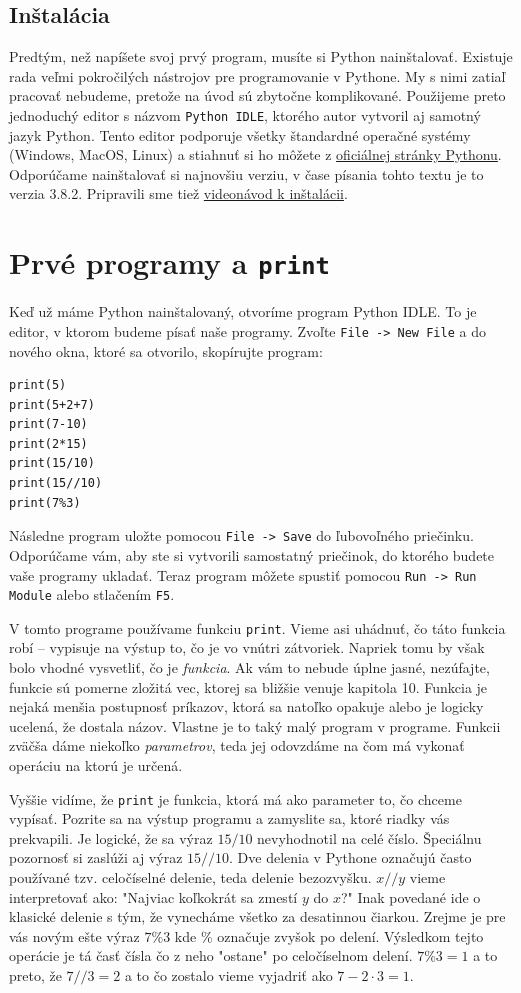 \documentclass{article}
\begin{document}
\subsection{Inštalácia}
Predtým, než napíšete svoj prvý program, musíte si Python nainštalovať. Existuje rada veľmi pokročilých nástrojov pre programovanie v Pythone. My s nimi zatiaľ pracovať nebudeme, pretože na úvod sú zbytočne komplikované.
Použijeme preto jednoduchý editor s názvom \texttt{Python IDLE}, ktorého autor vytvoril aj samotný jazyk Python. Tento editor podporuje všetky štandardné operačné systémy (Windows, MacOS, Linux) a stiahnuť si ho môžete z \href{https://www.python.org/downloads/}{oficiálnej stránky Pythonu}. Odporúčame nainštalovať si najnovšiu verziu, v čase písania tohto textu je to verzia 3.8.2. Pripravili sme tiež \href{https://www.youtube.com/watch?v=_oLcUfkgxSI}{videonávod k inštalácii}.

\section{Prvé programy a \texttt{print}}
Keď už máme Python nainštalovaný, otvoríme program Python IDLE. To je editor, v ktorom budeme písať naše programy. Zvoľte \texttt{File -> New File} a do nového okna, ktoré sa otvorilo, skopírujte program:
\begin{lstlisting}
print(5)
print(5+2+7)
print(7-10)
print(2*15)
print(15/10)
print(15//10)
print(7%3)
\end{lstlisting}
Následne program uložte pomocou \texttt{File -> Save} do ľubovoľného priečinku. Odporúčame vám, aby ste si vytvorili samostatný priečinok, do ktorého budete vaše programy ukladať. Teraz program môžete spustiť pomocou \texttt{Run -> Run Module} alebo stlačením \texttt{F5}. 

V tomto programe používame funkciu \texttt{print}. Vieme asi uhádnuť, čo táto funkcia robí -- vypisuje na výstup to, čo je vo vnútri zátvoriek. Napriek tomu by však bolo vhodné vysvetliť, čo je \textit{funkcia}. Ak vám to nebude úplne jasné, nezúfajte, funkcie sú pomerne zložitá vec, ktorej sa bližšie venuje kapitola 10.
Funkcia je nejaká menšia postupnosť príkazov, ktorá sa natoľko opakuje alebo je logicky ucelená, že dostala názov. Vlastne je to taký malý program v programe. Funkcii zväčša dáme niekoľko \textit{parametrov}, teda jej odovzdáme na čom má vykonať operáciu na ktorú je určená.

Vyššie vidíme, že \texttt{print} je funkcia, ktorá má ako parameter to, čo chceme vypísať. Pozrite sa na výstup programu a zamyslite sa, ktoré riadky vás prekvapili. Je logické, že sa výraz $15 / 10$ nevyhodnotil na celé číslo. Špeciálnu pozornosť si zaslúži aj výraz $15 // 10$. Dve delenia v Pythone označujú často používané tzv. celočíselné delenie, teda delenie bezozvyšku. $x // y$ vieme interpretovať ako: "Najviac koľkokrát sa zmestí $y$ do $x$?" Inak povedané ide o klasické delenie s tým, že vynecháme všetko za desatinnou čiarkou.
Zrejme je pre vás novým ešte výraz $7 \% 3$ kde \% označuje zvyšok po delení. Výsledkom tejto operácie je tá časť čísla čo z neho "ostane" po celočíselnom delení. $7\%3=1$ a to preto, že $7//3=2$ a to čo zostalo vieme vyjadriť ako $7 - 2 \cdot 3 = 1$.
\end{document}
